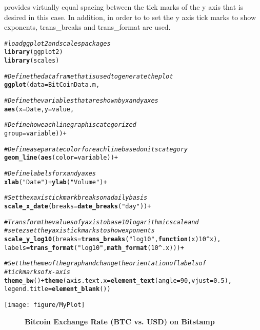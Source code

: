 \documentclass{article}\usepackage[]{graphicx}\usepackage[]{color}
\makeatletter
\def\maxwidth{ %
  \ifdim\Gin@nat@width>\linewidth
    \linewidth
  \else
    \Gin@nat@width
  \fi
}
\newcommand{\hlnum}[1]{\textcolor[rgb]{0.686,0.059,0.569}{#1}}%
\newcommand{\hlstr}[1]{\textcolor[rgb]{0.192,0.494,0.8}{#1}}%
\newcommand{\hlcom}[1]{\textcolor[rgb]{0.678,0.584,0.686}{\textit{#1}}}%
\newcommand{\hlopt}[1]{\textcolor[rgb]{0,0,0}{#1}}%
\newcommand{\hlstd}[1]{\textcolor[rgb]{0.345,0.345,0.345}{#1}}%
\newcommand{\hlkwa}[1]{\textcolor[rgb]{0.161,0.373,0.58}{\textbf{#1}}}%
\newcommand{\hlkwc}[1]{\textcolor[rgb]{0.333,0.667,0.333}{#1}}%
\newcommand{\hlkwd}[1]{\textcolor[rgb]{0.737,0.353,0.396}{\textbf{#1}}}%
\newenvironment{kframe}{%
 \def\at@end@of@kframe{}%
 \ifinner\ifhmode%
  \def\at@end@of@kframe{\end{minipage}}%
  \begin{minipage}{\columnwidth}%
 \fi\fi%
 \def\FrameCommand##1{\hskip\@totalleftmargin \hskip-\fboxsep
 \colorbox{shadecolor}{##1}\hskip-\fboxsep
     \hskip-\linewidth \hskip-\@totalleftmargin \hskip\columnwidth}%
 \MakeFramed {\advance\hsize-\width
   \@totalleftmargin\z@ \linewidth\hsize
   \@setminipage}}%
 {\par\unskip\endMakeFramed%
 \at@end@of@kframe}
\newenvironment{knitrout}{}{} %
\makeatother
\begin{document}
provides virtually equal spacing between the tick marks of the y axis that is 
desired in this case. In addition, in order to to set the y axis tick marks to show 
exponents, trans\_breaks and trans\_format are used.
\begin{knitrout}
\color{fgcolor}\begin{kframe}
\begin{alltt}
\hlcom{#load ggplot2 and scales packages}
\hlkwd{library}\hlstd{(ggplot2)}
\hlkwd{library}\hlstd{(scales)}

\hlcom{#Define the data frame that is used to generate the plot}
\hlkwd{ggplot}\hlstd{(}\hlkwc{data}\hlstd{=BitCoinData.m,}

\hlcom{#Define the variables that are shown by x and y axes        }
       \hlkwd{aes}\hlstd{(}\hlkwc{x}\hlstd{=Date,} \hlkwc{y}\hlstd{=value ,}

\hlcom{#Define how each line graph is categorized          }
           \hlkwc{group}\hlstd{=variable))}\hlopt{+}

\hlcom{#Define a separate color for each line based on its category}
       \hlkwd{geom_line}\hlstd{(}\hlkwd{aes}\hlstd{(}\hlkwc{color} \hlstd{= variable))}\hlopt{+}

\hlcom{#Define labels for x and y axes}
       \hlkwd{xlab}\hlstd{(}\hlstr{"Date"}\hlstd{)} \hlopt{+} \hlkwd{ylab}\hlstd{(}\hlstr{"Volume"}\hlstd{)}\hlopt{+}

\hlcom{#Set the x axis tick mark breaks on a daily basis}
       \hlkwd{scale_x_date}\hlstd{(}\hlkwc{breaks} \hlstd{=} \hlkwd{date_breaks}\hlstd{(}\hlstr{"day"}\hlstd{))}\hlopt{+}

\hlcom{#Transform the values of y axis to base 10 logarithmic scale and}
\hlcom{#setezset the y axis tick marks to show exponents}
       \hlkwd{scale_y_log10}\hlstd{(}\hlkwc{breaks} \hlstd{=} \hlkwd{trans_breaks}\hlstd{(}\hlstr{"log10"}\hlstd{,} \hlkwa{function}\hlstd{(}\hlkwc{x}\hlstd{)} \hlnum{10}\hlopt{^}\hlstd{x),}
       \hlkwc{labels} \hlstd{=} \hlkwd{trans_format}\hlstd{(}\hlstr{"log10"}\hlstd{,}\hlkwd{math_format}\hlstd{(}\hlnum{10}\hlopt{^}\hlstd{.x)))}\hlopt{+}

\hlcom{#Set the theme of the graph and change the orientation of labels of}
\hlcom{#tickmarks of x-axis}
       \hlkwd{theme_bw}\hlstd{()}\hlopt{+}\hlkwd{theme}\hlstd{(}\hlkwc{axis.text.x}\hlstd{=} \hlkwd{element_text}\hlstd{(}\hlkwc{angle}\hlstd{=}\hlnum{90}\hlstd{,} \hlkwc{vjust}\hlstd{=}\hlnum{0.5}\hlstd{),}
       \hlkwc{legend.title}\hlstd{=}\hlkwd{element_blank}\hlstd{())}
\end{alltt}
\end{kframe}
\texttt{[image: figure/MyPlot]} 

\end{knitrout}
\begin{figure}[htbp]
\caption{\textbf{Bitcoin Exchange Rate (BTC vs. USD) on Bitstamp}}
\label{exchange rate}
\end{figure}
\end{document}
